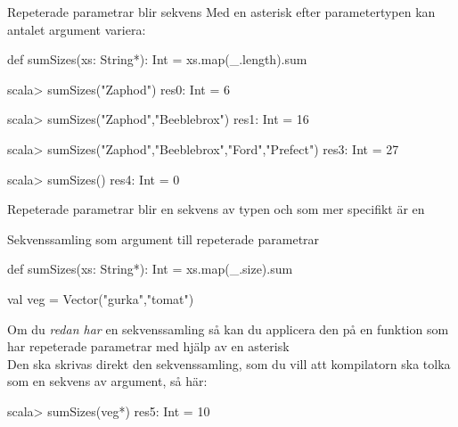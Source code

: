 


\begin{Slide}{Repeterade parametrar blir sekvens}\SlideFontSmall
Med en asterisk efter parametertypen kan antalet argument variera:
\begin{Code}[basicstyle=\fontsize{10}{12}\selectfont\ttfamily]
def sumSizes(xs: String*): Int = xs.map(_.length).sum
\end{Code}
\begin{REPLnonum}
scala> sumSizes("Zaphod")
res0: Int = 6

scala> sumSizes("Zaphod","Beeblebrox")
res1: Int = 16

scala> sumSizes("Zaphod","Beeblebrox","Ford","Prefect")
res3: Int = 27

scala> sumSizes()
res4: Int = 0
\end{REPLnonum}
Repeterade parametrar  blir en sekvens av typen  och som mer specifikt är en 
\end{Slide}


\begin{Slide}{Sekvenssamling som argument till repeterade parametrar}
\begin{Code}[basicstyle=\fontsize{10}{12}\selectfont\ttfamily]
def sumSizes(xs: String*): Int = xs.map(_.size).sum

val veg = Vector("gurka","tomat")
\end{Code}
Om du \emph{redan har} en sekvenssamling så kan du applicera den på en funktion
som har repeterade parametrar med hjälp av en asterisk \code{*} \\
\vspace{1em}Den ska skrivas direkt  den sekvenssamling, som du vill att kompilatorn ska tolka som en sekvens av argument, så här:
\begin{REPLnonum}
scala> sumSizes(veg*)
res5: Int = 10
\end{REPLnonum}

\end{Slide}
